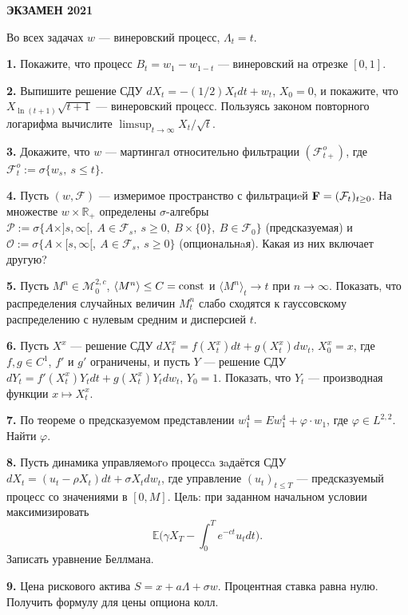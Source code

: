 \documentclass[12pt]{article}
\newcommand\cF{{\mathcal F}}
\newcommand\cM{{\mathcal M}}
\newcommand\cO{{\mathcal O}}
\newcommand\cP{{\mathcal P}}
\newcommand\E{{\mathbb E}}
\newcommand\R{{\mathbb R}}
\begin{document}
\centerline{\bf \Large ЭКЗАМЕН 2021}
\bigskip 
\bigskip
\bigskip
Во всех  задачах $w$ --- винеровский процесс, $\Lambda_t=t$.  

\medskip
\noindent
{\bf 1.} 
Покажите, что процесс  $B_t=w_1-w_{1-t}$ --- винеровский на отрезке $[0,1]$. 


\medskip
\noindent
{\bf 2.} 
Выпишите  решение СДУ $dX_t=-(1/2)X_tdt +w_t$, $X_0=0$,  и покажите, что $X_{\ln (t+1)}\sqrt {t+1} $ --- винеровский процесс.  
Пользуясь законом повторного логарифма вычислите $\limsup_{t\to \infty} X_t/\sqrt t$.  


\medskip
\noindent
{\bf 3.} 
Докажите, что $w$ --- мартингал относительно фильтрации $(\cF^o_{t+})$, где $\cF^o_t:=\sigma\{w_s,\ s\le t\}$. 

\medskip
\noindent
{\bf 4.} 
Пусть $(w,\cF)$ --- измеримое пространство с  фильтрациeй ${\bf F}=(\cF_t)_{t\ge 0}$.   На множестве 
$w\times \R_+$  определены  $\sigma$-алгебры $\cP:=\sigma\{ A\times ]s,\infty[, \  A\in \cF_s,\ s\ge 0, \ B\times \{0\},\  B\in\cF_0\}$   (предсказуемая) и $\cO:=\sigma\{A\times [s,\infty[, \ A\in \cF_s, \  s\ge 0\}$ (опциональнaя). Какая из них включает другую? 

\medskip
\noindent
{\bf 5.}  Пусть   $M^n\in \cM^{2,c}_0$,  $\langle M^n\rangle\le C={\rm const} $  и $\langle M^n\rangle_t\to t$        при  $n\to \infty$. Показать, что распределения случайных величин  $M^n_t$ слабо сходятся к гауссовскому  распределению с нулевым средним и дисперсией $t$. 

\medskip
\noindent
{\bf 6.}  Пусть $X^x$ --- решение  СДУ $dX^x_t=f(X^x_t)dt +g(X^x_t)dw_t$, $X^x_0=x$,  где $f,g\in C^1$, $f'$ и $g'$ ограничены, и пусть $Y$  --- решение СДУ $dY_t=f'(X^x_t)Y_tdt +g(X^x_t)Y_tdw_t$, $Y_0=1$. Показать, что  $Y_t$ --- производная функции  $x\mapsto X_t^x$.

\medskip
\noindent
{\bf 7.}  По теореме о предсказуемом  представлении $w_1^4=E w_1^4+\varphi\cdot w_1$, где $\varphi\in L^{2,2}$. Найти $\varphi$. 

\medskip
\noindent
{\bf 8.}  
Пусть динамика управляемoгo процессa зaдаётся СДУ
$dX_t=(u_t-\rho X_t)dt +\sigma X_tdw_t$, 
где управление $(u_t)_{t\le T}$ --- предсказуемый процесс со значениями в  $[0,M]$. Цель: при заданном начальном условии максимизировать 
$$
\E \Big(\gamma X_T- \int_0^T e^{-ct}u_t dt\Big).
$$
Записать уравнение Беллмана.  
 

\medskip
\noindent
{\bf 9.} Цена рискового актива  $S=x+a\Lambda +\sigma w$. Процентная ставка равна нулю. Получить формулу для цены опциона колл. 
\end{document}
